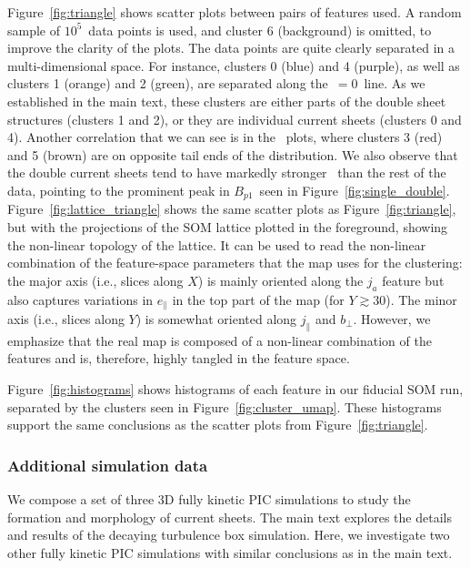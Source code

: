 Figure~\ref{fig:triangle} shows scatter plots between pairs of features used. A random sample of $10^5$\ data points is used, and cluster 6 (background) is omitted, to improve the clarity of the plots. The data points are quite clearly separated in a multi-dimensional space. For instance, clusters 0 (blue) and 4 (purple), as well as clusters 1 (orange) and 2 (green), are separated along the \jpar\,$=0$\ line. As we established in the main text, these clusters are either parts of the double sheet structures (clusters 1 and 2), or they are individual current sheets (clusters 0 and 4). Another correlation that we can see is in the \epar\ plots, where clusters 3 (red) and 5 (brown) are on opposite tail ends of the distribution. We also observe that the double current sheets tend to have markedly stronger \bperp\ than the rest of the data, pointing to the prominent peak in $B_{p1}$~seen in Figure~\ref{fig:single_double}.
Figure~\ref{fig:lattice_triangle} shows the same scatter plots as Figure~\ref{fig:triangle}, but with the projections of the SOM lattice plotted in the foreground, showing the non-linear topology of the lattice.
It can be used to read the non-linear combination of the feature-space parameters that the map uses for the clustering:
the major axis (i.e., slices along $X$) is mainly oriented along the $j_a$ feature but also captures variations in $e_\parallel$ in the top part of the map (for $Y \gtrsim 30$).
The minor axis (i.e., slices along $Y$) is somewhat oriented along $j_\parallel$ and $b_\perp$.
However, we emphasize that the real map is composed of a non-linear combination of the features and is, therefore, highly tangled in the feature space.

Figure~\ref{fig:histograms} shows histograms of each feature in our fiducial SOM run, separated by the clusters seen in Figure~\ref{fig:cluster_umap}. These histograms support the same conclusions as the scatter plots from Figure~\ref{fig:triangle}.

\subsubsection{Additional simulation data} \label{app:other-sims}

We compose a set of three 3D fully kinetic PIC simulations to study the formation and morphology of current sheets. The main text explores the details and results of the decaying turbulence box simulation.
Here, we investigate two other fully kinetic PIC simulations with similar conclusions as in the main text.

